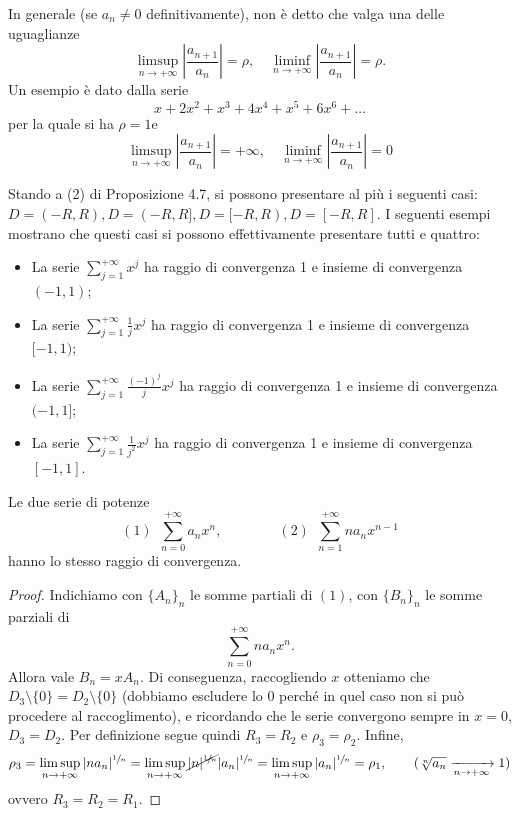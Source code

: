 \begin{oss}
    In generale (se $a_{n} \neq 0$ definitivamente), non è detto che valga una delle uguaglianze
    \[\limsup _{n \rightarrow+\infty}\left|\frac{a_{n+1}}{a_{n}}\right|=\rho, \quad \liminf _{n \rightarrow+\infty}\left|\frac{a_{n+1}}{a_{n}}\right|=\rho .\]
    Un esempio è dato dalla serie
    \[x+2 x^{2}+x^{3}+4 x^{4}+x^{5}+6 x^{6}+\ldots\]
    per la quale si ha $\rho=1 \mathrm{e}$
    \[\limsup _{n \rightarrow+\infty}\left|\frac{a_{n+1}}{a_{n}}\right|=+\infty, \quad \liminf _{n \rightarrow+\infty}\left|\frac{a_{n+1}}{a_{n}}\right|=0\]
\end{oss}
\begin{oss}
    Stando a (2) di Proposizione 4.7, si possono presentare al più i seguenti casi: $D=(-R, R), D=(-R, R], D=[-R, R), D=[-R, R]$. I seguenti esempi mostrano che questi casi si possono effettivamente presentare tutti e quattro:
    \begin{itemize}
        \item La serie $\sum_{j=1}^{+\infty} x^{j}$ ha raggio di convergenza 1 e insieme di convergenza $(-1,1)$;
        \item La serie $\sum_{j=1}^{+\infty} \frac{1}{j} x^{j}$ ha raggio di convergenza 1 e insieme di convergenza $[-1,1)$;
        \item La serie $\sum_{j=1}^{+\infty} \frac{(-1)^{j}}{j} x^{j}$ ha raggio di convergenza 1 e insieme di convergenza $(-1,1]$;
        \item La serie $\sum_{j=1}^{+\infty} \frac{1}{j^{2}} x^{j}$ ha raggio di convergenza 1 e insieme di convergenza $[-1,1]$. 
    \end{itemize}
    
\end{oss}
\begin{proposition}[$*$]\label{prop: 4.9}
    Le due serie di potenze
    \[(1)\ \ \sum_{n=0}^{+\infty} a_{n} x^{n}, \qquad\qquad (2)\ \ \sum_{n=1}^{+\infty} n a_{n} x^{n-1}\]
    hanno lo stesso raggio di convergenza.
\end{proposition}
\begin{proof}
    Indichiamo con $\{A_n\}_n$ le somme partiali di $(1)$, con $\{B_n\}_n$ le somme parziali di
    \[\sum_{n=0}^{+\infty}na_nx^n\tag{3}.\]
    Allora vale $B_n = xA_n$. Di conseguenza, raccogliendo $x$ otteniamo che $D_3\setminus \{0\} = D_2\setminus \{0\}$ (dobbiamo escludere lo 0 perché in quel caso non si può procedere al raccoglimento), e ricordando che le serie convergono sempre in $x=0$, $D_3 = D_2$. Per definizione segue quindi $R_3 = R_2$ e $\rho_3 = \rho_2$. Infine, 
    \[\rho_3 = \limsup_{n\to +\infty}|na_n|^{\sfrac{1}{n}} = \limsup_{n\to +\infty}\cancel{|n|^{\sfrac{1}{n}}}|a_n|^{\sfrac{1}{n}} = \limsup_{n\to +\infty}|a_n|^{\sfrac{1}{n}} = \rho_1,\qquad (\sqrt[n]{a_n}\xrightarrow[n\to +\infty]{}1)\]
    ovvero $R_3 = R_2 = R_1$.
\end{proof}


